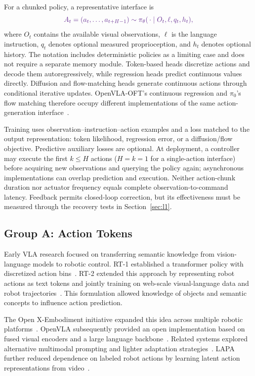 \documentclass{ieeeaccess}
\begin{document}
\textcolor[RGB]{104,48,148}{For a chunked policy, a representative interface is}
\begin{equation}
\color[RGB]{104,48,148}
A_t=(a_t,\ldots,a_{t+H-1})\sim\pi_\theta(\,\cdot\mid O_t,\ell,q_t,h_t),
\label{eq:vla-interface}
\end{equation}
\textcolor[RGB]{104,48,148}{where $O_t$ contains the available visual observations, $\ell$ is the language instruction, $q_t$ denotes optional measured proprioception, and $h_t$ denotes optional history. The notation includes deterministic policies as a limiting case and does not require a separate memory module. Token-based heads discretize actions and decode them autoregressively, while regression heads predict continuous values directly. Diffusion and flow-matching heads generate continuous actions through conditional iterative updates. OpenVLA-OFT's continuous regression and $\pi_0$'s flow matching therefore occupy different implementations of the same action-generation interface~\cite{openvla,openvlaoft,pi0}.}

\textcolor[RGB]{104,48,148}{Training uses observation--instruction--action examples and a loss matched to the output representation: token likelihood, regression error, or a diffusion/flow objective. Predictive auxiliary losses are optional. At deployment, a controller may execute the first $k\leq H$ actions ($H=k=1$ for a single-action interface) before acquiring new observations and querying the policy again; asynchronous implementations can overlap prediction and execution. Neither action-chunk duration nor actuator frequency equals complete observation-to-command latency. Feedback permits closed-loop correction, but its effectiveness must be measured through the recovery tests in Section~\ref{sec:l1}.}

\subsection{Group A: Action Tokens}
\label{sec:groupA}

Early VLA research focused on transferring semantic knowledge from vision-language models to robotic control. RT-1 established a transformer policy with discretized action bins~\cite{rt1}. RT-2 extended this approach by representing robot actions as text tokens and jointly training on web-scale visual-language data and robot trajectories~\cite{rt2}. This formulation allowed knowledge of objects and semantic concepts to influence action prediction.

The Open X-Embodiment initiative expanded this idea across multiple robotic platforms~\cite{oxe}. OpenVLA subsequently provided an open implementation based on fused visual encoders and a large language backbone~\cite{openvla}. Related systems explored alternative multimodal prompting and lighter adaptation strategies~\cite{vima,roboflamingo,llarva}. LAPA further reduced dependence on labeled robot actions by learning latent action representations from video~\cite{lapa}.
\end{document}
